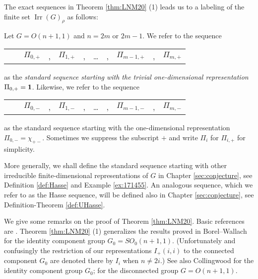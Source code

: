 The exact sequences in Theorem \ref{thm:LNM20} (1) leads us
 to a labeling of the finite set ${\operatorname{Irr}}(G)_{\rho}$
 as follows: 
\begin{definition}
\label{def:Pii}
Let $G=O(n+1,1)$
 and $n=2m$ or $2m-1$.  
We refer to the sequence 
\begin{center}
\begin{tabular}{ccccccccccc}
& &$\Pi_{0,+}$&,&$\Pi_{1,+} $ & ,  &\dots & , & $\Pi_{m-1,+} $ &, & $\Pi_{m,+}$ 
\end{tabular}
\end{center}
as the 
{\it standard sequence starting
 with the trivial one-dimensional representation 
$\Pi_{0,+}={\bf{1}}$}.  
Likewise,
 we refer to the sequence
\begin{center}
\begin{tabular}{ccccccccccc}
& &$\Pi_{0,-}$&,&$\Pi_{1,-} $ & ,  &\dots & , & $\Pi_{m-1,-} $ &, & $\Pi_{m,-}$ 
\end{tabular}
\end{center}
as the standard sequence starting with the one-dimensional representation 
 $\Pi_{0,-}=\chi_{+-}$.  
Sometimes we suppress the subscript $+$
 and write 
 $\Pi_{i}$ for $\Pi_{i,+}$ for simplicity.  
\end{definition}



More generally,
 we shall define the standard sequence 
 starting with other irreducible finite-dimensional representations of $G$
 in Chapter \ref{sec:conjecture}, 
 see Definition \ref{def:Hasse} and Example \ref{ex:171455}. 
An analogous sequence, 
 which we refer to as the Hasse sequence,
 will be defined also in Chapter \ref{sec:conjecture}, 
 see Definition-Theorem \ref{def:UHasse}.   

\vskip 1pc
We give some remarks on the proof of Theorem \ref{thm:LNM20}.  
Basic references are \cite{BW, C, KKP}.  
Theorem \ref{thm:LNM20} (1) generalizes the results proved
 in Borel--Wallach 
 \cite[pp.~128--129 in the new edition; p.~192 in the old edition]{BW}
 for the identity component group 
 $G_0=SO_0(n+1,1)$.  
(Unfortunately and confusingly the restriction
 of our representations $I_+(i,i)$
 to the connected component $G_0$ are denoted there by $I_i$
 when $n \ne 2i$.) 
See also Collingwood \cite[Chap.~5, Sect.~2]{C} for 
 the identity component group $G_0$;
\cite[p.~20]{KKP}
 for the disconnected group $G=O(n+1,1)$. 



